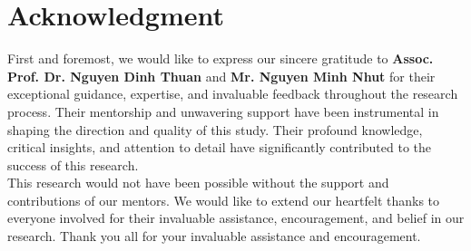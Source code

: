 \documentclass{ieeeojies}
\begin{document}
\section*{Acknowledgment}
First and foremost, we would like to express our sincere gratitude to \textbf{Assoc. Prof. Dr. Nguyen Dinh Thuan} and \textbf{Mr. Nguyen Minh Nhut} for their exceptional guidance, expertise, and invaluable feedback throughout the research process. Their mentorship and unwavering support have been instrumental in shaping the direction and quality of this study. Their profound knowledge, critical insights, and attention to detail have significantly contributed to the success of this research.
\\This research would not have been possible without the support and contributions of our mentors. We would like to extend our heartfelt thanks to everyone involved for their invaluable assistance, encouragement, and belief in our research. Thank you all for your invaluable assistance and encouragement.

\EOD
\printbibliography
\end{document}
